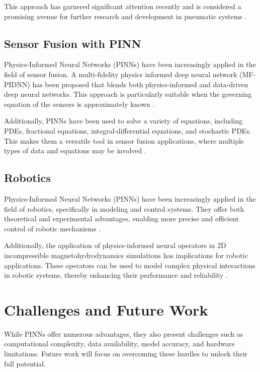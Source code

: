 \documentclass[12pt]{article}
\begin{document}
	This approach has garnered significant attention recently and is considered a promising avenue for further research and development in pneumatic systems \cite{researchgate-pneumatic}.
		
	\subsection{Sensor Fusion with PINN}
	Physics-Informed Neural Networks (PINNs) have been increasingly applied in the field of sensor fusion. A multi-fidelity physics informed deep neural network (MF-PIDNN) has been proposed that blends both physics-informed and data-driven deep neural networks. This approach is particularly suitable when the governing equation of the sensors is approximately known \cite{sciencedirect-sensor}. 
	
	Additionally, PINNs have been used to solve a variety of equations, including PDEs, fractional equations, integral-differential equations, and stochastic PDEs. This makes them a versatile tool in sensor fusion applications, where multiple types of data and equations may be involved \cite{springer-sensor}.
		
	\subsection{Robotics}
	Physics-Informed Neural Networks (PINNs) have been increasingly applied in the field of robotics, specifically in modeling and control systems. They offer both theoretical and experimental advantages, enabling more precise and efficient control of robotic mechanisms \cite{researchgate-robotics1}. 
	
	Additionally, the application of physics-informed neural operators in 2D incompressible magnetohydrodynamics simulations has implications for robotic applications. These operators can be used to model complex physical interactions in robotic systems, thereby enhancing their performance and reliability \cite{researchgate-robotics2}.
		
	\section{Challenges and Future Work}
	While PINNs offer numerous advantages, they also present challenges such as computational complexity, data availability, model accuracy, and hardware limitations. Future work will focus on overcoming these hurdles to unlock their full potential.
	
\end{document}
